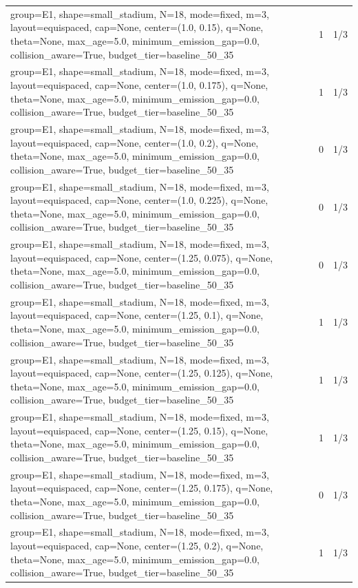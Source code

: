 \begin{tabular}{p{11cm}rr}
group=E1, shape=small\_stadium, N=18, mode=fixed, m=3, layout=equispaced, cap=None, center=(1.0, 0.15), q=None, theta=None, max\_age=5.0, minimum\_emission\_gap=0.0, collision\_aware=True, budget\_tier=baseline\_50\_35 & 1 & 1/3 \\
group=E1, shape=small\_stadium, N=18, mode=fixed, m=3, layout=equispaced, cap=None, center=(1.0, 0.175), q=None, theta=None, max\_age=5.0, minimum\_emission\_gap=0.0, collision\_aware=True, budget\_tier=baseline\_50\_35 & 1 & 1/3 \\
group=E1, shape=small\_stadium, N=18, mode=fixed, m=3, layout=equispaced, cap=None, center=(1.0, 0.2), q=None, theta=None, max\_age=5.0, minimum\_emission\_gap=0.0, collision\_aware=True, budget\_tier=baseline\_50\_35 & 0 & 1/3 \\
group=E1, shape=small\_stadium, N=18, mode=fixed, m=3, layout=equispaced, cap=None, center=(1.0, 0.225), q=None, theta=None, max\_age=5.0, minimum\_emission\_gap=0.0, collision\_aware=True, budget\_tier=baseline\_50\_35 & 0 & 1/3 \\
group=E1, shape=small\_stadium, N=18, mode=fixed, m=3, layout=equispaced, cap=None, center=(1.25, 0.075), q=None, theta=None, max\_age=5.0, minimum\_emission\_gap=0.0, collision\_aware=True, budget\_tier=baseline\_50\_35 & 0 & 1/3 \\
group=E1, shape=small\_stadium, N=18, mode=fixed, m=3, layout=equispaced, cap=None, center=(1.25, 0.1), q=None, theta=None, max\_age=5.0, minimum\_emission\_gap=0.0, collision\_aware=True, budget\_tier=baseline\_50\_35 & 1 & 1/3 \\
group=E1, shape=small\_stadium, N=18, mode=fixed, m=3, layout=equispaced, cap=None, center=(1.25, 0.125), q=None, theta=None, max\_age=5.0, minimum\_emission\_gap=0.0, collision\_aware=True, budget\_tier=baseline\_50\_35 & 1 & 1/3 \\
group=E1, shape=small\_stadium, N=18, mode=fixed, m=3, layout=equispaced, cap=None, center=(1.25, 0.15), q=None, theta=None, max\_age=5.0, minimum\_emission\_gap=0.0, collision\_aware=True, budget\_tier=baseline\_50\_35 & 1 & 1/3 \\
group=E1, shape=small\_stadium, N=18, mode=fixed, m=3, layout=equispaced, cap=None, center=(1.25, 0.175), q=None, theta=None, max\_age=5.0, minimum\_emission\_gap=0.0, collision\_aware=True, budget\_tier=baseline\_50\_35 & 0 & 1/3 \\
group=E1, shape=small\_stadium, N=18, mode=fixed, m=3, layout=equispaced, cap=None, center=(1.25, 0.2), q=None, theta=None, max\_age=5.0, minimum\_emission\_gap=0.0, collision\_aware=True, budget\_tier=baseline\_50\_35 & 1 & 1/3 \\

\end{tabular}
